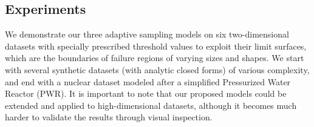 %

\subsection{Experiments}
\label{sec:experiments}
We demonstrate our three adaptive sampling models on six two-dimensional datasets with specially prescribed threshold values to exploit their limit surfaces, which are the boundaries of failure regions of varying sizes and shapes.
%
We start with several synthetic datasets (with analytic closed forms) of various complexity, and end with a nuclear dataset modeled after a simplified Pressurized Water Reactor (PWR).
%
It is important to note that our proposed models could be extended and applied to high-dimensional datasets, although it becomes much harder to validate the results through visual inspection.

